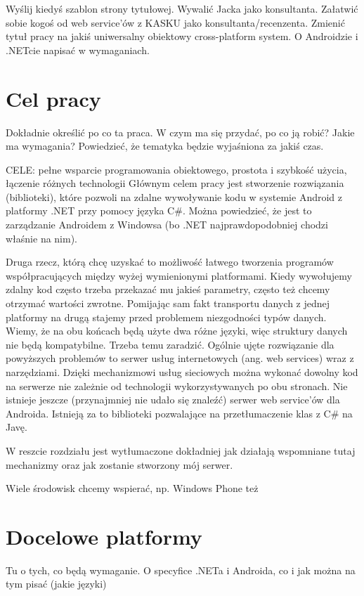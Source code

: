\documentclass[twoside,a4paper]{book}
\begin{document}
\begin{em}
Wyślij kiedyś szablon strony tytułowej.
Wywalić Jacka jako konsultanta. Załatwić sobie kogoś od web service’ów z KASKU jako konsultanta/recenzenta. Zmienić tytuł pracy na jakiś uniwersalny obiektowy cross-platform system. O Androidzie i .NETcie napisać w wymaganiach.
\end{em}

\section{Cel pracy}
Dokładnie określić po co ta praca. W czym ma się przydać, po co ją robić? Jakie ma wymagania?
Powiedzieć, że tematyka będzie wyjaśniona za jakiś czas.

CELE: pełne wsparcie programowania obiektowego, prostota i szybkość użycia, łączenie różnych technologii
Głównym celem pracy jest stworzenie rozwiązania (biblioteki), które pozwoli na zdalne wywoływanie kodu w systemie Android z platformy .NET przy pomocy języka C\#. Można powiedzieć, że jest to zarządzanie Androidem z Windowsa (bo .NET najprawdopodobniej chodzi właśnie na nim).

Druga rzecz, którą chcę uzyskać to możliwość łatwego tworzenia programów współpracujących między wyżej wymienionymi platformami. Kiedy wywołujemy zdalny kod często trzeba przekazać mu jakieś parametry, często też chcemy otrzymać wartości zwrotne. Pomijając sam fakt transportu danych z jednej platformy na drugą stajemy przed problemem niezgodności typów danych. Wiemy, że na obu końcach będą użyte dwa różne języki, więc struktury danych nie będą kompatybilne. Trzeba temu zaradzić.
Ogólnie ujęte rozwiązanie dla powyższych problemów to serwer usług internetowych (ang. web services) wraz z narzędziami. Dzięki mechanizmowi usług sieciowych można wykonać dowolny kod na serwerze nie zależnie od technologii wykorzystywanych po obu stronach. Nie istnieje jeszcze (przynajmniej nie udało się znaleźć) serwer web service’ów dla Androida. Istnieją za to biblioteki pozwalające na przetłumaczenie klas z C\# na Javę.

W reszcie rozdziału jest wytłumaczone dokładniej jak działają wspomniane tutaj mechanizmy oraz jak zostanie stworzony mój serwer.

Wiele środowisk chcemy wspierać, np. Windows Phone też

\section{Docelowe platformy}
Tu o tych, co będą wymaganie. O specyfice .NETa i Androida, co i jak można na tym pisać (jakie języki)
\end{document}
